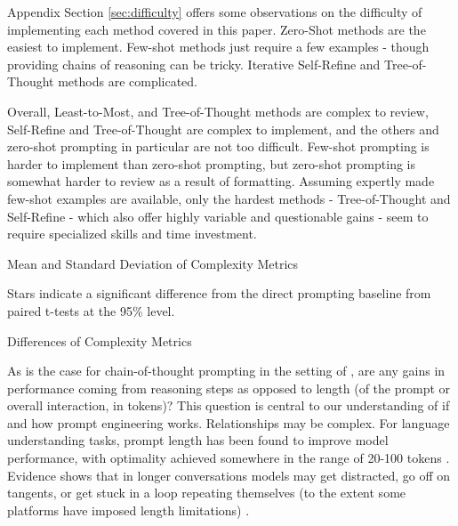 \documentclass[11pt]{article}
\begin{document}
Appendix Section \ref{sec:difficulty} offers some observations on the difficulty of implementing each method covered in this paper. Zero-Shot methods are the easiest to implement. Few-shot methods just require a few examples - though providing chains of reasoning can be tricky. Iterative Self-Refine and Tree-of-Thought methods are complicated.

Overall, Least-to-Most, and Tree-of-Thought methods are complex to review, Self-Refine and Tree-of-Thought are complex to implement, and the others and zero-shot prompting in particular are not too difficult. Few-shot prompting is harder to implement than zero-shot prompting, but zero-shot prompting is somewhat harder to review as a result of formatting. Assuming expertly made few-shot examples are available, only the hardest methods - Tree-of-Thought and Self-Refine - which also offer highly variable and questionable gains - seem to require specialized skills and time investment.

%


\begin{table}
  \caption{Mean and Standard Deviation of Complexity Metrics}
  \centering
  \tiny
    
  \label{tab:avg_complexity_metrics_pivot}
  \newline \newline \footnotesize Stars indicate a significant difference from the direct prompting baseline from paired t-tests at the 95\% level.
\end{table}

\begin{table}
  \caption{Differences of Complexity Metrics}
  \centering
  \tiny
    
  \label{tab:avg_complexity_diff_metrics_pivot}
\end{table}



As is the case for chain-of-thought prompting in the setting of \citealp{fu_complexity-based_2023}, are any gains in performance coming from reasoning steps as opposed to length (of the prompt or overall interaction, in tokens)? This question is central to our understanding of if and how prompt engineering works. Relationships may be complex. For language understanding tasks, prompt length has been found to improve model performance, with optimality achieved somewhere in the range of 20-100 tokens \cite{lester_power_2021}. Evidence shows that in longer conversations models may get distracted, go off on tangents, or get stuck in a loop repeating themselves (to the extent some platforms have imposed length limitations) \cite{shi_large_2023, mann_microsoft_nodate}. 
\end{document}
